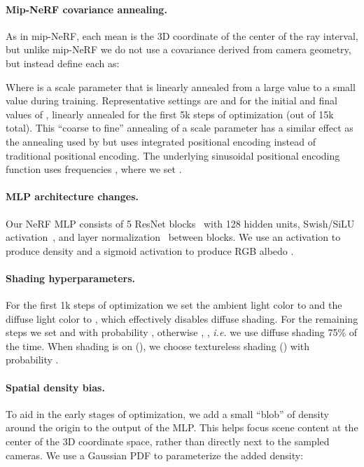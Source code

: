 \documentclass{article} \usepackage{iclr2023_conference,times}
\begin{document}
\paragraph{Mip-NeRF covariance annealing.} As in mip-NeRF, each mean  is the 3D coordinate of the center of the ray interval, but unlike mip-NeRF we do not use a covariance derived from camera geometry, but instead define each  as:

Where  is a scale parameter that is linearly annealed from a large value to a small value during training. Representative settings are  and  for the initial and final values of , linearly annealed for the first 5k steps of optimization (out of 15k total).
This ``coarse to fine'' annealing of a scale parameter has a similar effect as the annealing used by \citet{park2021nerfies} but uses integrated positional encoding instead of traditional positional encoding. The underlying sinusoidal positional encoding function uses frequencies , where we set .


\paragraph{MLP architecture changes.} Our NeRF MLP consists of 5 ResNet blocks~\citep{he2016deep} with 128 hidden units, Swish/SiLU activation~\citep{hendrycks2016gaussian}, and layer normalization~\citep{ba2016layer} between blocks. We use an  activation to produce density  and a sigmoid activation to produce RGB albedo .

\paragraph{Shading hyperparameters.} For the first 1k steps of optimization we set the ambient light color  to  and the diffuse light color  to , which effectively disables diffuse shading. For the remaining steps we set  and  with probability , otherwise , , \textit{i.e.} we use diffuse shading 75\% of the time. When shading is on (), we choose textureless shading () with probability .


\paragraph{Spatial density bias.} To aid in the early stages of optimization, we add a small ``blob'' of density around the origin to the output of the MLP. This helps focus scene content at the center of the 3D coordinate space, rather than directly next to the sampled cameras. We use a Gaussian PDF to parameterize the added density:
\end{document}
